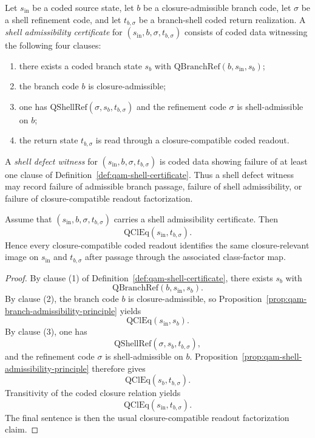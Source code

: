 \begin{definition}\label{def:qam-shell-certificate}
Let $s_{\mathrm{in}}$ be a coded source state, let $b$ be a closure-admissible branch code, let $\sigma$ be a shell refinement code, and let $t_{b,\sigma}$ be a branch-shell coded return realization. A \emph{shell admissibility certificate} for $(s_{\mathrm{in}},b,\sigma,t_{b,\sigma})$ consists of coded data witnessing the following four clauses:
\begin{enumerate}[leftmargin=2em]
  \item there exists a coded branch state $s_b$ with $\mathrm{QBranchRef}(b,s_{\mathrm{in}},s_b)$;
  \item the branch code $b$ is closure-admissible;
  \item one has $\mathrm{QShellRef}(\sigma,s_b,t_{b,\sigma})$ and the refinement code $\sigma$ is shell-admissible on $b$;
  \item the return state $t_{b,\sigma}$ is read through a closure-compatible coded readout.
\end{enumerate}
\end{definition}

\begin{definition}\label{def:qam-shell-defect-witness}
A \emph{shell defect witness} for $(s_{\mathrm{in}},b,\sigma,t_{b,\sigma})$ is coded data showing failure of at least one clause of Definition~\ref{def:qam-shell-certificate}. Thus a shell defect witness may record failure of admissible branch passage, failure of shell admissibility, or failure of closure-compatible readout factorization.
\end{definition}

\begin{lemma}\label{lem:qam-shell-certificate-closure}
Assume that $(s_{\mathrm{in}},b,\sigma,t_{b,\sigma})$ carries a shell admissibility certificate. Then
\[
\mathrm{QClEq}(s_{\mathrm{in}},t_{b,\sigma}).
\]
Hence every closure-compatible coded readout identifies the same closure-relevant image on $s_{\mathrm{in}}$ and $t_{b,\sigma}$ after passage through the associated class-factor map.
\end{lemma}

\begin{proof}
By clause (1) of Definition~\ref{def:qam-shell-certificate}, there exists $s_b$ with
\[
\mathrm{QBranchRef}(b,s_{\mathrm{in}},s_b).
\]
By clause (2), the branch code $b$ is closure-admissible, so Proposition~\ref{prop:qam-branch-admissibility-principle} yields
\[
\mathrm{QClEq}(s_{\mathrm{in}},s_b).
\]
By clause (3), one has
\[
\mathrm{QShellRef}(\sigma,s_b,t_{b,\sigma}),
\]
and the refinement code $\sigma$ is shell-admissible on $b$. Proposition~\ref{prop:qam-shell-admissibility-principle} therefore gives
\[
\mathrm{QClEq}(s_b,t_{b,\sigma}).
\]
Transitivity of the coded closure relation yields
\[
\mathrm{QClEq}(s_{\mathrm{in}},t_{b,\sigma}).
\]
The final sentence is then the usual closure-compatible readout factorization claim.
\end{proof}

